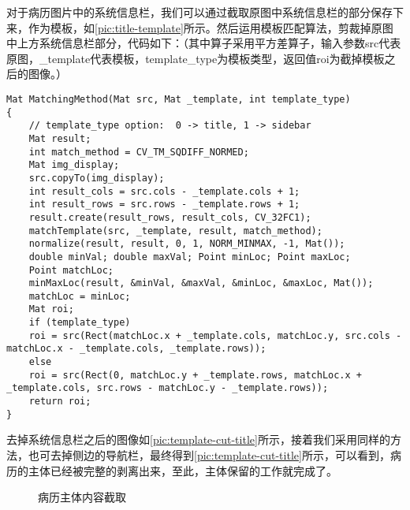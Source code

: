 对于病历图片中的系统信息栏，我们可以通过截取原图中系统信息栏的部分保存下来，作为模板，如\autoref{pic:title-template}所示。然后运用模板匹配算法，剪裁掉原图中上方系统信息栏部分，代码如下：（其中算子采用平方差算子，输入参数src代表原图，\_template代表模板，template\_type为模板类型，返回值roi为截掉模板之后的图像。）
\begin{lstlisting}
Mat MatchingMethod(Mat src, Mat _template, int template_type)
{
	// template_type option:  0 -> title, 1 -> sidebar
	Mat result;
	int match_method = CV_TM_SQDIFF_NORMED;
	Mat img_display;
	src.copyTo(img_display);
	int result_cols = src.cols - _template.cols + 1;
	int result_rows = src.rows - _template.rows + 1;
	result.create(result_rows, result_cols, CV_32FC1);
	matchTemplate(src, _template, result, match_method);
	normalize(result, result, 0, 1, NORM_MINMAX, -1, Mat());
	double minVal; double maxVal; Point minLoc; Point maxLoc;
	Point matchLoc;
	minMaxLoc(result, &minVal, &maxVal, &minLoc, &maxLoc, Mat());
	matchLoc = minLoc;
	Mat roi;
	if (template_type)
	roi = src(Rect(matchLoc.x + _template.cols, matchLoc.y, src.cols - matchLoc.x - _template.cols, _template.rows));
	else
	roi = src(Rect(0, matchLoc.y + _template.rows, matchLoc.x + _template.cols, src.rows - matchLoc.y - _template.rows));
	return roi;
}
\end{lstlisting}

去掉系统信息栏之后的图像如\autoref{pic:template-cut-title}所示，接着我们采用同样的方法，也可去掉侧边的导航栏，最终得到\autoref{pic:template-cut-title}所示，可以看到，病历的主体已经被完整的剥离出来，至此，主体保留的工作就完成了。

\begin{figure}[htbp]
  \centering
  \caption{病历主体内容截取}
  \label{pic:different-layout}
\end{figure}

